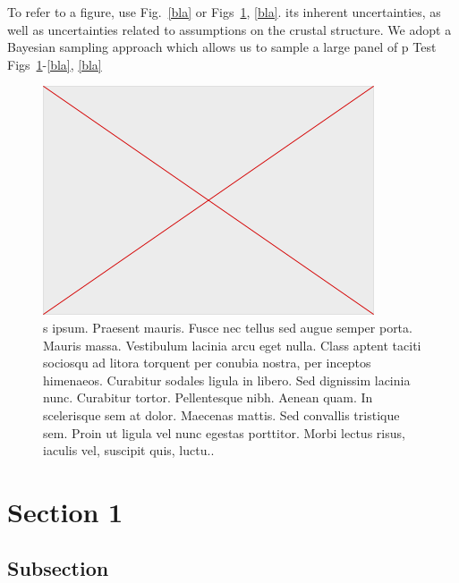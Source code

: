 \documentclass[breakmath]{seismica}
\begin{document}
	To refer to a figure, use Fig.~\ref{bla} or Figs~\ref{fig:1}, \ref{bla}.  its inherent uncertainties, as well as uncertainties related to assumptions on the crustal structure. We adopt a Bayesian sampling approach which allows us to sample a large panel of p Test  Figs~\ref{fig:1}-\ref{bla}, \ref{bla}
	
	\lipsum
	
	\begin{figure}
		\includegraphics[width=\columnwidth]{empty} 
		\caption{s ipsum. Praesent mauris. Fusce nec tellus sed augue semper porta. Mauris massa. Vestibulum lacinia arcu eget nulla. Class aptent taciti sociosqu ad litora torquent per conubia nostra, per inceptos himenaeos. Curabitur sodales ligula in libero. Sed dignissim lacinia nunc. Curabitur tortor. Pellentesque nibh. Aenean quam. In scelerisque sem at dolor. Maecenas mattis. Sed convallis tristique sem. Proin ut ligula vel nunc egestas porttitor. Morbi lectus risus, iaculis vel, suscipit quis, luctu..}
		\label{fig:1}
	\end{figure}
	
	
	\section{Section 1}
	
	\subsection{Subsection }
	
	\lipsum
	
\end{document}
